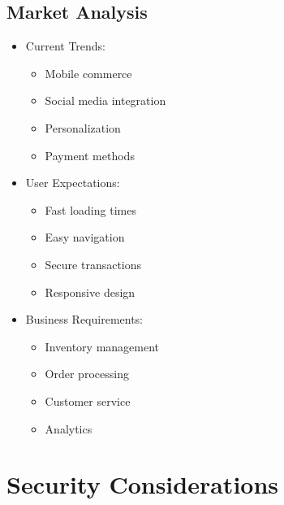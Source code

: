 \subsection{Market Analysis}
\begin{itemize}
    \item Current Trends:
    \begin{itemize}
        \item Mobile commerce
        \item Social media integration
        \item Personalization
        \item Payment methods
    \end{itemize}
    \item User Expectations:
    \begin{itemize}
        \item Fast loading times
        \item Easy navigation
        \item Secure transactions
        \item Responsive design
    \end{itemize}
    \item Business Requirements:
    \begin{itemize}
        \item Inventory management
        \item Order processing
        \item Customer service
        \item Analytics
    \end{itemize}
\end{itemize}

\section{Security Considerations}
